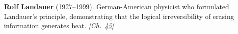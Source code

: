 \textbf{Rolf Landauer} (1927–1999). German-American physicist who formulated Landauer's principle, demonstrating that the logical irreversibility of erasing information generates heat. \emph{[Ch.~\hyperref[ch:maxwelldemon]{45}]}

